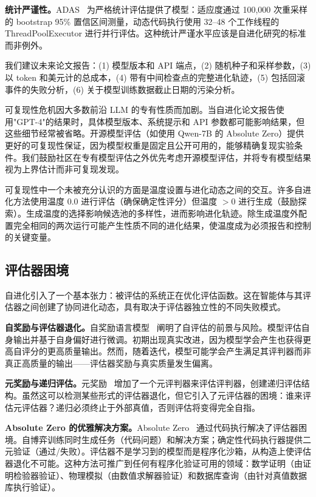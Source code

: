 \textbf{统计严谨性。}ADAS~\citep{adas2025} 为严格统计评估提供了模型：适应度通过 100,000 次重采样的 bootstrap 95\% 置信区间测量，动态代码执行使用 32--48 个工作线程的 ThreadPoolExecutor 进行并行评估。这种统计严谨水平应该是自进化研究的标准而非例外。

我们建议未来论文报告：(1) 模型版本和 API 端点，(2) 随机种子和采样参数，(3) 以 token 和美元计的总成本，(4) 带有中间检查点的完整进化轨迹，(5) 包括回滚事件的失败分析，(6) 关于模型训练数据截止日期的污染分析。

可复现性危机因大多数前沿 LLM 的专有性质而加剧。当自进化论文报告使用"GPT-4"的结果时，具体模型版本、系统提示和 API 参数都可能影响结果，但这些细节经常被省略。开源模型评估（如使用 Qwen-7B 的 Absolute Zero）提供更好的可复现性保证，因为模型权重是固定且公开可用的，能够精确复现实验条件。我们鼓励社区在专有模型评估之外优先考虑开源模型评估，并将专有模型结果视为上界估计而非可复现发现。

可复现性中一个未被充分认识的方面是温度设置与进化动态之间的交互。许多自进化方法使用温度 0.0 进行评估（确保确定性评分）但温度 $>$0 进行生成（鼓励探索）。生成温度的选择影响候选池的多样性，进而影响进化轨迹。除生成温度外配置完全相同的两次运行可能产生性质不同的进化结果，使温度成为必须报告和控制的关键变量。


\subsection{评估器困境}
\label{sec:eval-dilemma}

自进化引入了一个基本张力：被评估的系统正在优化评估函数。这在智能体与其评估器之间创建了协同进化动态，具有取决于评估器独立性的不同失败模式。

\textbf{自奖励与评估器退化。}自奖励语言模型~\citep{selfrewarding2024} 阐明了自评估的前景与风险。模型评估自身输出并基于自身偏好进行微调。初期出现真实改进，因为模型学会产生也获得更高自评分的更高质量输出。然而，随着迭代，模型可能学会产生满足其评判器而非真正高质量的输出——评估器奖励与真实质量发生偏离。

\textbf{元奖励与递归评估。}元奖励~\citep{metarewarding2024} 增加了一个元评判器来评估评判器，创建递归评估结构。虽然这可以检测某些形式的评估器退化，但它引入了元评估器的困境：谁来评估元评估器？递归必须终止于外部真值，否则评估将变得完全自指。

\textbf{Absolute Zero 的优雅解决方案。}Absolute Zero~\citep{absolutezero2025} 通过代码执行解决了评估器困境。自博弈训练同时生成任务（代码问题）和解决方案；确定性代码执行器提供二元验证（通过/失败）。评估器不是学习到的模型而是程序化沙箱，从构造上使评估器退化不可能。这种方法可推广到任何有程序化验证可用的领域：数学证明（由证明检验器验证）、物理模拟（由数值求解器验证）和数据库查询（由针对真值数据库执行验证）。

